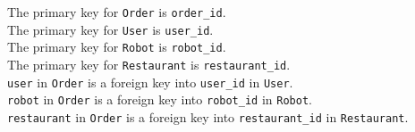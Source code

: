 \documentclass{report}
\renewcommand{\tt}[1]{\texttt{{#1}}}
\begin{document}
The primary key for \tt{Order} is \tt{order\_id}. \\
The primary key for \tt{User} is \tt{user\_id}. \\
The primary key for \tt{Robot} is \tt{robot\_id}. \\
The primary key for \tt{Restaurant} is \tt{restaurant\_id}. \\
\tt{user} in \tt{Order} is a foreign key into \tt{user\_id} in \tt{User}. \\
\tt{robot} in \tt{Order} is a foreign key into \tt{robot\_id} in \tt{Robot}. \\
\tt{restaurant} in \tt{Order} is a foreign key into \tt{restaurant\_id} in \tt{Restaurant}. \\
\end{document}
